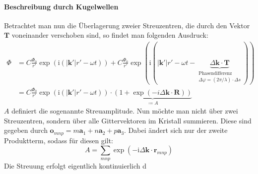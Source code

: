 \paragraph{Beschreibung durch Kugelwellen}
Betrachtet man nun die Überlagerung zweier Streuzentren, die durch den Vektor $\mathbf{T}$ voneinander verschoben sind,
so findet man folgenden Ausdruck:
\begin{align*}
    \Phi &= C \frac{\Phi_{0}}{r'}\exp(\mathrm{i}(\lvert \mathbf{k}' \rvert r'-\omega t)) + C\frac{\Phi_{0}}{r'}
    \exp(\mathrm{i}(\lvert \mathbf{k}' \rvert r'-\omega t- \underbrace{ \Delta \mathbf{k}\cdot \mathbf{T} }_{
        \substack{\text{Phasendifferenz} \\ \Delta\varphi=(2\pi / \lambda) \cdot \Delta s  }})) \\
    &=C \frac{\Phi_{0}}{r'}\exp(\mathrm{i}(\lvert \mathbf{k}' \rvert r'-\omega t))\cdot\underbrace{ (1+\exp(-i \Delta
    \mathbf{k}\cdot \mathbf{R})) }_{ \coloneqq A }
\end{align*}
$A$ definiert die sogenannte Streuamplitude.
Nun möchte man nicht über zwei Streuzentren, sondern über alle Gittervektoren im Kristall summieren.
Diese sind gegeben durch $\mathbf{o}_{mnp}=m\mathbf{a}_{1}+n\mathbf{a}_{2}+p\mathbf{a}_{3}$.
Dabei ändert sich nur der zweite Produktterm, sodass für diesen gilt:
\begin{equation*}
    A = \sum_{mnp}\exp(-\mathrm{i} \Delta \mathbf{k}\cdot \mathbf{r}_{mnp})
\end{equation*}
Die Streuung erfolgt eigentlich kontinuierlich d
